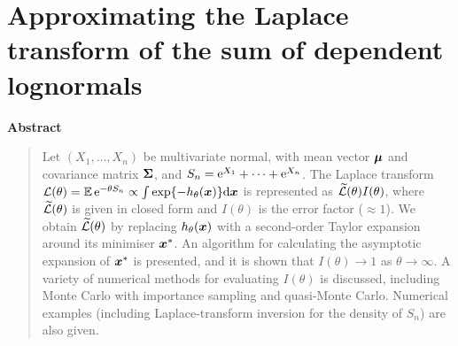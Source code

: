 \chapter{Approximating the Laplace transform of the sum of dependent lognormals}

% 

\begin{center}
\textbf{Abstract}
\end{center}
\begin{quote}
Let $(X_1, \dots, X_n)$ be multivariate normal, with mean vector $\bm{\mu}$ and
covariance matrix $\bm{\Sigma}$, and $S_n=\mathrm{e}^{X_1}+\cdots+\mathrm{e}^{X_n}$. The
Laplace transform ${\cal L}(\theta)=\operatorname{{\mathbb E}}\mathrm{e}^{-\theta S_n}\propto \int
\exp\{-h_\theta(\bm{x})\} \mathrm{d} \bm{x}$ is represented as $\widetilde {\cal
  L}(\theta)I(\theta)$, where $\widetilde {\cal L}(\theta)$ is given in closed
form and $I(\theta)$ is the error factor ($\approx 1$). We obtain $\widetilde
{\cal L}(\theta)$ by replacing $h_\theta(\bm{x})$ with a second-order Taylor
expansion around its minimiser $\bm{x}^*$. An algorithm for calculating the
asymptotic expansion of $\bm{x}^*$ is presented, and it is shown that
$I(\theta)\to 1$ as $\theta\to\infty$.  A variety of numerical methods for
evaluating $I(\theta)$ is discussed, including Monte Carlo with importance
sampling and quasi-Monte Carlo. Numerical examples (including
Laplace-transform inversion for the density of $S_n$) are also given.
\end{quote}


